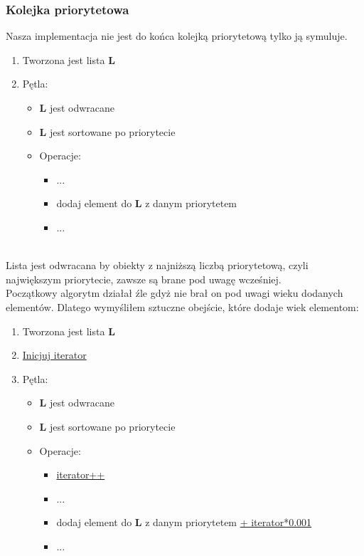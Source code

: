 \documentclass{article}
\begin{document}
\subsubsection{Kolejka priorytetowa}
Nasza implementacja nie jest do końca kolejką priorytetową tylko ją symuluje. \\
\begin{enumerate}
\item Tworzona jest lista \textbf{L}
\item Pętla:
	\begin{itemize}
	\item \textbf{L} jest odwracane
	\item \textbf{L} jest sortowane po priorytecie
	\item Operacje:
		\begin{itemize}
		\item ...
		\item dodaj element do \textbf{L} z danym priorytetem
		\item ...
		\end{itemize}				
	\end{itemize}
\end{enumerate}
\\
Lista jest odwracana by obiekty z najniższą liczbą priorytetową, czyli największym priorytecie, zawsze są brane pod uwagę wcześniej. \\
Początkowy algorytm działał źle gdyż nie brał on pod uwagi wieku dodanych elementów.
Dlatego wymyśliłem sztuczne obejście, które dodaje wiek elementom:
\begin{enumerate}
\item Tworzona jest lista \textbf{L}
\item \underline{Inicjuj iterator}
\item Pętla:
	\begin{itemize}
	\item \textbf{L} jest odwracane
	\item \textbf{L} jest sortowane po priorytecie
	\item Operacje:
		\begin{itemize}
		\item \underline{iterator++}
		\item ...
		\item dodaj element do \textbf{L} z danym priorytetem \underline{+ iterator*0.001}
		\item ...
		\end{itemize}				
	\end{itemize}
\end{enumerate}%
\end{document}
